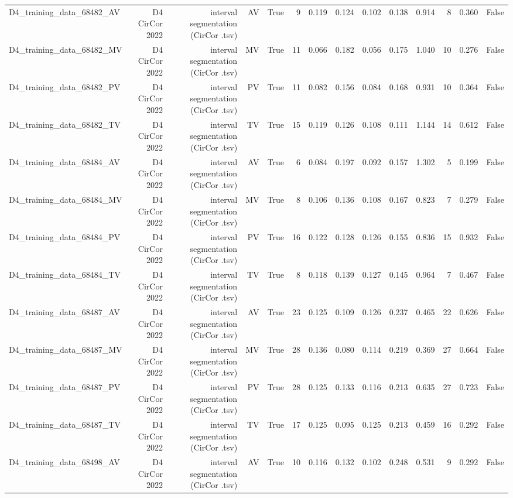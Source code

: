 \begin{table}[htbp]
\begin{tabular}{lrrrrrrrrrrrrr}
    D4\_training\_data\_68482\_AV & D4 CirCor 2022 & interval segmentation (CirCor .tsv) & AV & True & 9 & 0.119 & 0.124 & 0.102 & 0.138 & 0.914 & 8 & 0.360 & False \\
    D4\_training\_data\_68482\_MV & D4 CirCor 2022 & interval segmentation (CirCor .tsv) & MV & True & 11 & 0.066 & 0.182 & 0.056 & 0.175 & 1.040 & 10 & 0.276 & False \\
    D4\_training\_data\_68482\_PV & D4 CirCor 2022 & interval segmentation (CirCor .tsv) & PV & True & 11 & 0.082 & 0.156 & 0.084 & 0.168 & 0.931 & 10 & 0.364 & False \\
    D4\_training\_data\_68482\_TV & D4 CirCor 2022 & interval segmentation (CirCor .tsv) & TV & True & 15 & 0.119 & 0.126 & 0.108 & 0.111 & 1.144 & 14 & 0.612 & False \\
    D4\_training\_data\_68484\_AV & D4 CirCor 2022 & interval segmentation (CirCor .tsv) & AV & True & 6 & 0.084 & 0.197 & 0.092 & 0.157 & 1.302 & 5 & 0.199 & False \\
    D4\_training\_data\_68484\_MV & D4 CirCor 2022 & interval segmentation (CirCor .tsv) & MV & True & 8 & 0.106 & 0.136 & 0.108 & 0.167 & 0.823 & 7 & 0.279 & False \\
    D4\_training\_data\_68484\_PV & D4 CirCor 2022 & interval segmentation (CirCor .tsv) & PV & True & 16 & 0.122 & 0.128 & 0.126 & 0.155 & 0.836 & 15 & 0.932 & False \\
    D4\_training\_data\_68484\_TV & D4 CirCor 2022 & interval segmentation (CirCor .tsv) & TV & True & 8 & 0.118 & 0.139 & 0.127 & 0.145 & 0.964 & 7 & 0.467 & False \\
    D4\_training\_data\_68487\_AV & D4 CirCor 2022 & interval segmentation (CirCor .tsv) & AV & True & 23 & 0.125 & 0.109 & 0.126 & 0.237 & 0.465 & 22 & 0.626 & False \\
    D4\_training\_data\_68487\_MV & D4 CirCor 2022 & interval segmentation (CirCor .tsv) & MV & True & 28 & 0.136 & 0.080 & 0.114 & 0.219 & 0.369 & 27 & 0.664 & False \\
    D4\_training\_data\_68487\_PV & D4 CirCor 2022 & interval segmentation (CirCor .tsv) & PV & True & 28 & 0.125 & 0.133 & 0.116 & 0.213 & 0.635 & 27 & 0.723 & False \\
    D4\_training\_data\_68487\_TV & D4 CirCor 2022 & interval segmentation (CirCor .tsv) & TV & True & 17 & 0.125 & 0.095 & 0.125 & 0.213 & 0.459 & 16 & 0.292 & False \\
    D4\_training\_data\_68498\_AV & D4 CirCor 2022 & interval segmentation (CirCor .tsv) & AV & True & 10 & 0.116 & 0.132 & 0.102 & 0.248 & 0.531 & 9 & 0.292 & False \\

\end{tabular}
\end{table}
